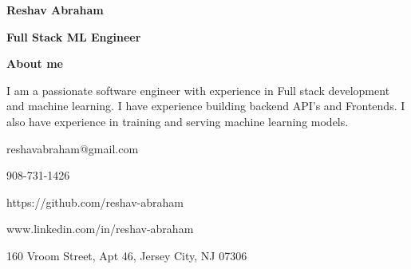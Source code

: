 \documentclass{article}
\begin{document}
\begin{minipage}[t][0pt]{8in\linewidth}
    \begin{minipage}[t]{5.5in\linewidth}
    \Huge\vspace{0in}\hspace{-0.30em}\textbf{Reshav Abraham}  

    \vspace{0em}\hspace{-0.2em}\Large\textbf{Full Stack ML Engineer} 

    \vspace{0.5em}\hspace{0em}\small\textbf{About me} 

        \begin{minipage}[t]{0.6\textwidth\hspace{0em}}
        I am a passionate software engineer with experience in Full stack development
        and machine learning. I have experience building backend API's and Frontends. I also have experience in training and serving machine learning models. \par
        \end{minipage}
    \end{minipage}
    \begin{minipage}[t]{17em\linewidth\hspace{-3em}}
        
        \vspace{0.7em}
        \faEnvelopeO\hspace{0.4em}\small\mdseries\textrm{reshavabraham@gmail.com}

        \faPhone\hspace{0.4em}\small\mdseries\textrm{908-731-1426}
        
        \faGithub\hspace{0.4em}\small\mdseries\textrm{https://github.com/reshav-abraham}

        \faLinkedin\hspace{0.4em}\small\mdseries\textrm{www.linkedin.com/in/reshav-abraham}

        \faHome\hspace{0.4em}\small\mdseries\textrm{160 Vroom Street, Apt 46, Jersey City, NJ 07306}
    \end{minipage}

\vspace{0.5em}

\begin{minipage}[t]{0.45\textwidth\hspace{0in}}


\end{minipage}
\end{minipage}
\end{document}
